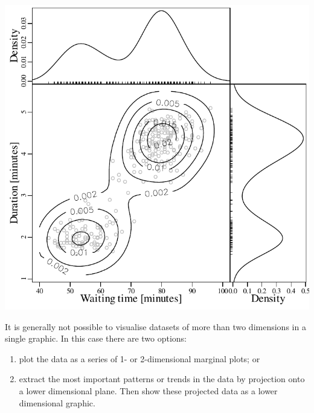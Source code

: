 \noindent\begin{minipage}[t][][b]{.5\textwidth}
  \includegraphics[width=\textwidth]{../figures/KDE2D.pdf}\\
\end{minipage}
\begin{minipage}[t][][t]{.5\textwidth}
  \label{fig:KDE2D}
\end{minipage}

It is generally not possible to visualise datasets of more than two
dimensions in a single graphic. In this case there are two options:

\begin{enumerate}
  \item plot the data as a series of 1- or 2-dimensional marginal
    plots; or
  \item extract the most important patterns or trends in the data by
    projection onto a lower dimensional plane. Then show these
    projected data as a lower dimensional graphic.
\end{enumerate}

